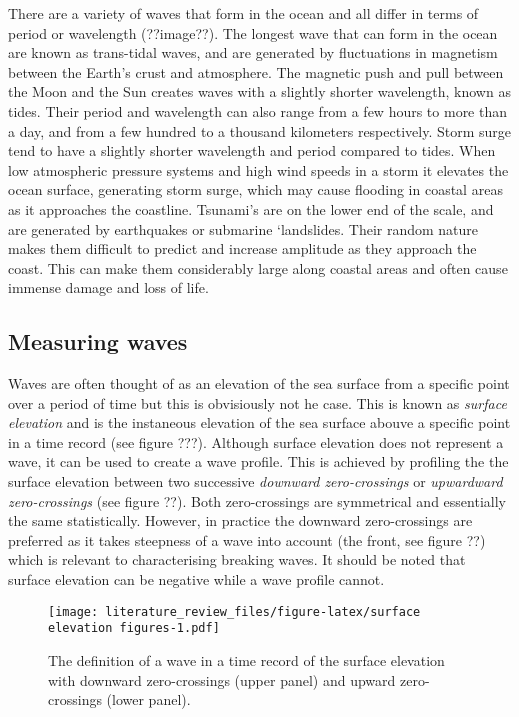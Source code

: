 \documentclass[]{article}
\begin{document}
There are a variety of waves that form in the ocean and all differ in
terms of period or wavelength (??image??). The longest wave that can
form in the ocean are known as trans-tidal waves, and are generated by
fluctuations in magnetism between the Earth's crust and atmosphere. The
magnetic push and pull between the Moon and the Sun creates waves with a
slightly shorter wavelength, known as tides. Their period and wavelength
can also range from a few hours to more than a day, and from a few
hundred to a thousand kilometers respectively. Storm surge tend to have
a slightly shorter wavelength and period compared to tides. When low
atmospheric pressure systems and high wind speeds in a storm it elevates
the ocean surface, generating storm surge, which may cause flooding in
coastal areas as it approaches the coastline. Tsunami's are on the lower
end of the scale, and are generated by earthquakes or submarine
`landslides. Their random nature makes them difficult to predict and
increase amplitude as they approach the coast. This can make them
considerably large along coastal areas and often cause immense damage
and loss of life.

\hypertarget{measuring-waves}{%
\subsection{Measuring waves}\label{measuring-waves}}

Waves are often thought of as an elevation of the sea surface from a
specific point over a period of time but this is obvisiously not he
case. This is known as \emph{surface elevation} and is the instaneous
elevation of the sea surface abouve a specific point in a time record
(see figure ???). Although surface elevation does not represent a wave,
it can be used to create a wave profile. This is achieved by profiling
the the surface elevation between two successive \emph{downward
zero-crossings} or \emph{upwardward zero-crossings} (see figure ??).
Both zero-crossings are symmetrical and essentially the same
statistically. However, in practice the downward zero-crossings are
preferred as it takes steepness of a wave into account (the front, see
figure ??) which is relevant to characterising breaking waves. It should
be noted that surface elevation can be negative while a wave profile
cannot.

\begin{figure}
\centering
\texttt{[image: literature\_review\_files/figure-latex/surface elevation figures-1.pdf]}
\caption{The definition of a wave in a time record of the surface
elevation with downward zero-crossings (upper panel) and upward
zero-crossings (lower panel).}
\end{figure}
\end{document}
